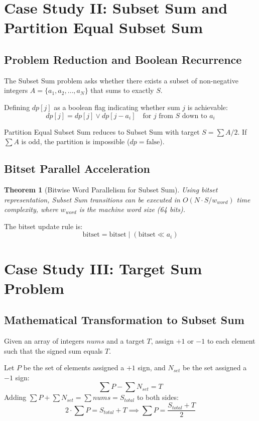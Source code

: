 \documentclass[10pt,journal,compsoc,onecolumn]{IEEEtran}
\newtheorem{theorem}{Theorem}
\begin{document}
\section{Case Study II: Subset Sum and Partition Equal Subset Sum}
\label{sec:subset-sum}

\subsection{Problem Reduction and Boolean Recurrence}

The Subset Sum problem asks whether there exists a subset of non-negative integers $A = \{a_1, a_2, \dots, a_N\}$ that sums to exactly $S$.

Defining $dp[j]$ as a boolean flag indicating whether sum $j$ is achievable:
\[
dp[j] = dp[j] \lor dp[j - a_i] \quad \text{for } j \text{ from } S \text{ down to } a_i
\]

Partition Equal Subset Sum reduces to Subset Sum with target $S = \sum A / 2$. If $\sum A$ is odd, the partition is impossible ($dp = \text{false}$).

\subsection{Bitset Parallel Acceleration}

\begin{theorem}[Bitwise Word Parallelism for Subset Sum]
Using bitset representation, Subset Sum transitions can be executed in $O(N \cdot S / w_{word})$ time complexity, where $w_{word}$ is the machine word size (64 bits).
\end{theorem}

The bitset update rule is:
\[
\text{bitset} = \text{bitset} \mid (\text{bitset} \ll a_i)
\]


\section{Case Study III: Target Sum Problem}
\label{sec:target-sum}

\subsection{Mathematical Transformation to Subset Sum}

Given an array of integers $nums$ and a target $T$, assign $+1$ or $-1$ to each element such that the signed sum equals $T$.

Let $P$ be the set of elements assigned a $+1$ sign, and $N_{set}$ be the set assigned a $-1$ sign:
\[
\sum P - \sum N_{set} = T
\]
Adding $\sum P + \sum N_{set} = \sum nums = S_{total}$ to both sides:
\[
2 \cdot \sum P = S_{total} + T \implies \sum P = \frac{S_{total} + T}{2}
\]
\end{document}
